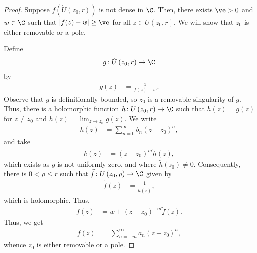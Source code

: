 \documentclass[10pt]{mypackage}
\begin{document}
\begin{proof}
  Suppose $f\left( \dot{U}\left( z_0,r \right) \right)$ is not dense in $\C$. Then, there exists $\ve > 0$ and $w\in \C$ such that $\left\vert f(z) - w \right\vert \geq \ve$ for all $z\in \dot{U}\left( z_0,r \right)$. We will show that $z_0$ is either removable or a pole.%

  Define
  \begin{align*}
    g\colon \dot{U}\left( z_0,r \right)\rightarrow \C
  \end{align*}
  by
  \begin{align*}
    g(z) &= \frac{1}{f(z) - w}.
  \end{align*}
  Observe that $g$ is definitionally bounded, so $z_0$ is a removable singularity of $g$. Thus, there is a holomorphic function $h\colon U\left( z_0,r \right)\rightarrow \C$ such that $h(z) = g(z)$ for $z\neq z_0$ and $h(z) = \lim_{z\rightarrow z_0}g(z)$. We write
  \begin{align*}
    h(z) &= \sum_{n=0}^{\infty}b_n\left( z-z_0 \right)^{n},
  \end{align*}
  and take
  \begin{align*}
    h(z) &= \left( z-z_0 \right)^{m} \widetilde{h}(z),
  \end{align*}
  which exists as $g$ is not uniformly zero, and where $ \widetilde{h}\left( z_0 \right) \neq 0 $. Consequently, there is $0 < \rho \leq r$ such that $ \widetilde{f}\colon U\left( z_0,\rho \right)\rightarrow \C $ given by
  \begin{align*}
    \widetilde{f}(z) &= \frac{1}{ \widetilde{h}(z) },
  \end{align*}
  which is holomorphic. Thus,
  \begin{align*}
    f(z) &= w + \left( z-z_0 \right)^{-m} \widetilde{f}(z).
  \end{align*}
  Thus, we get
  \begin{align*}
    f(z) &= \sum_{n=-m}^{\infty} a_n\left( z-z_0 \right)^{n},
  \end{align*}
  whence $z_0$ is either removable or a pole.
\end{proof}
\end{document}

